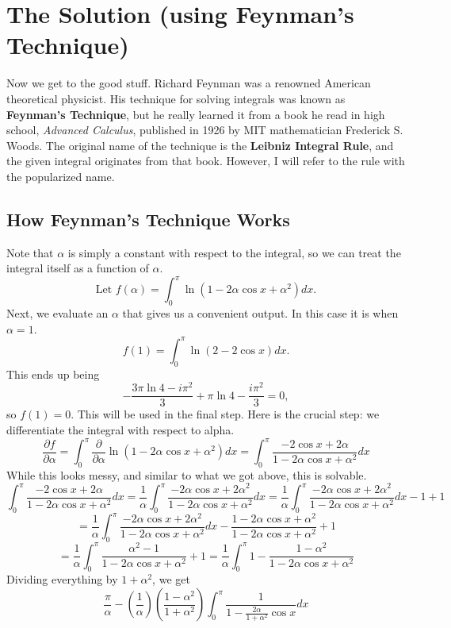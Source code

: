 \documentclass{article}
\begin{document}
\section*{The Solution (using Feynman's Technique)}
\newline Now we get to the good stuff. Richard Feynman was a renowned American theoretical physicist. His technique for solving integrals was known as \textbf{Feynman's Technique}, but he really learned it from a book he read in high school, \textit{Advanced Calculus}, published in 1926 by MIT mathematician Frederick S. Woods. The original name of the technique is the \textbf{Leibniz Integral Rule}, and the given integral originates from that book. However, I will refer to the rule with the popularized name.
\subsection*{How Feynman's Technique Works}
Note that $\alpha$ is simply a constant with respect to the integral, so we can treat the integral itself as a function of $\alpha$.
$$\text{Let } f(\alpha)=\int_{0}^{\pi} \ln(1-2\alpha\cos{x}+\alpha^2)dx.$$
Next, we evaluate an $\alpha$ that gives us a convenient output. In this case it is when $\alpha=1$.
$$f(1)=\int_{0}^{\pi} \ln(2-2\cos{x})dx.$$
This ends up being
$$-\frac{3\pi\ln{4}-i\pi^2}{3}+\pi\ln{4}-\frac{i\pi^2}{3} = 0,$$
so $f(1)=0.$ This will be used in the final step.
\newline Here is the crucial step: we differentiate the integral with respect to alpha.
$$\frac{\partial f}{\partial \alpha} = \int_{0}^{\pi}\frac{\partial}{\partial \alpha}\ln(1-2\alpha\cos{x}+\alpha^2)dx = \int_{0}^{\pi}\frac{-2\cos{x}+2\alpha}{1-2\alpha\cos{x}+\alpha^2}dx$$
While this looks messy, and similar to what we got above, this is solvable.
$$\int_{0}^{\pi}\frac{-2\cos{x}+2\alpha}{1-2\alpha\cos{x}+\alpha^2}dx = \frac{1}{\alpha}\int_{0}^{\pi}\frac{-2\alpha\cos{x}+2\alpha^2}{1-2\alpha\cos{x}+\alpha^2}dx = \frac{1}{\alpha}\int_{0}^{\pi}\frac{-2\alpha\cos{x}+2\alpha^2}{1-2\alpha\cos{x}+\alpha^2}dx - 1 + 1$$
$$=\frac{1}{\alpha}\int_{0}^{\pi}\frac{-2\alpha\cos{x}+2\alpha^2}{1-2\alpha\cos{x}+\alpha^2}dx - \frac{1-2\alpha\cos{x}+\alpha^2}{1-2\alpha\cos{x}+\alpha^2} + 1$$
$$=\frac{1}{\alpha}\int_{0}^{\pi}\frac{\alpha^2-1}{1-2\alpha\cos{x}+\alpha^2} + 1 = \frac{1}{\alpha}\int_{0}^{\pi}1 - \frac{1-\alpha^2}{1-2\alpha\cos{x}+\alpha^2}$$
Dividing everything by $1+\alpha^2$, we get
$$\frac{\pi}{\alpha}-(\frac{1}{\alpha})(\frac{1-\alpha^2}{1+\alpha^2})\int_{0}^{\pi}\frac{1}{1-\frac{2\alpha}{1+\alpha^2}\cos{x}}dx$$
\end{document}
